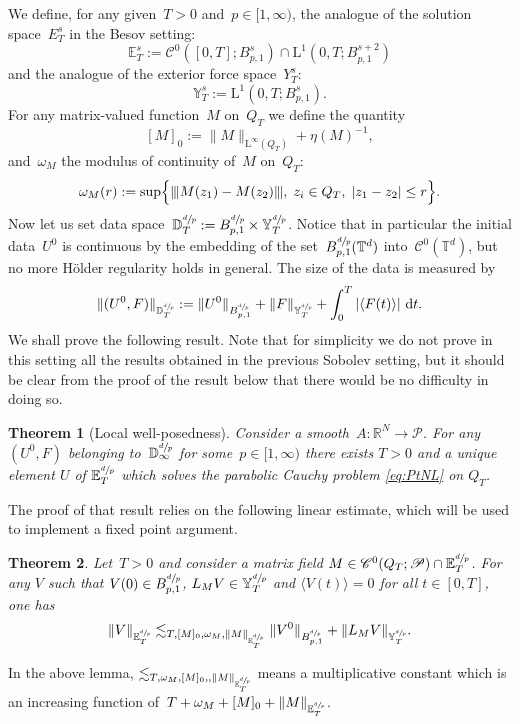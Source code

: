 \documentclass[JEP,XML,SOM,Unicode,published]{cedram}
\newtheorem{thm}{Theorem}
\theoremstyle{definition}
\newcommand\R{\mathbb{R}}
\newcommand\E{\mathbb{E}}
\newcommand\T{\mathbb{T}}
\newcommand\dd{\mathrm{d}}
\renewcommand\L{\mathrm{L}}
\newcommand{\vertiii}[1]{{\vert\kern-0.08em\vert\kern-0.08em\vert #1 \vert\kern-0.08em\vert\kern-0.08em\vert}}
\begin{document}
We define, for any given~$T>0$ and~$p \in [1,\infty)$, the analogue of the solution space~$E_T^s$ in the Besov setting:
\[
\E^s_T:= \mathcal C^0 ([0,T];B^s_{p,1}) \cap \L^1 (0,T;B^{s+2}_{p,1})
\]
and the analogue of the exterior force space~$Y_T^s$:
\[
{\mathbb Y}_T^{s}:= \L^1 (0,T;B^{s }_{p,1}).
\]
For any matrix-valued function~$M$ on~$Q_T$ we define the quantity
\begin{equation}\label{defnormalphabesov}
[M]_{0}:=\|M\|_{\L^\infty(Q_T)}+\eta(M)^{-1},\end{equation}
and~$ \omega_M $ the modulus of continuity of~$M$ on~$Q_T$:
\[
\omega_M(r):=\sup\Bigl\{ \vertiii {M(z_1)- M(z_2)}, \; z_i \in Q_T, \; |z_1-z_2| \leq r\Bigr\}.
\]
Now let us set data space~$
\mathbb D_T^{\sfrac dp}:=B^{\sfrac dp}_{p,1}\times{\mathbb Y}_T^{\sfrac dp} $. Notice that in particular the initial data~$U^0$ is continuous by the embedding of the set~$B^{\sfrac dp}_{p,1}(\T^d)$ into~$ \mathcal C^0(\T^d)$, but no more H\"older regularity holds in general. The size of the data is measured by
\[
\|(U^0,F)\|_{ \mathbb D_T^{\sfrac dp}}:= \|U^0\|_{B^{\sfrac dp}_{p,1}} + \|F\|_{{\mathbb Y}_T^{\sfrac dp} } + \int_0^T \left|\langle F(t)\rangle\right|\,\dd t.
\]
We shall prove the following result. Note that for simplicity we do not prove in this setting all the results obtained in the previous Sobolev setting, but it should be clear from the proof of the result below that there would be no difficulty in doing so.
\begin{thm}[Local well-posedness] \label{thm:exlocbesov}
Consider a smooth~$A:\R^N\to \mathscr{P}$. For any $(U^0,F)$ belonging to~$ \mathbb D_\infty^{\sfrac dp}$ for some~$p \in [1,\infty)$ there exists $T>0$ and a unique element $U$ of $\E^{\sfrac dp}_T$ which solves the parabolic Cauchy problem \eqref{eq:PtNL} on $Q_T$.
\end{thm}
The proof of that result relies on the following linear estimate, which will be used to implement a fixed point argument.
\begin{thm} \label{thm:PetrovskiiBesov}
Let~$T>0$ and consider a matrix field $M\in\mathscr{C}^{0}(Q_T;\mathscr{P})\cap \E^{\sfrac dp}_T$. For any $V$ such that $V(0)\in B^{\sfrac dp}_{p,1}$, $L_{M }V\in{\mathbb Y}_T^{\sfrac dp} $ and $\langle V(t)\rangle=0$ for all $t\in[0,T]$, one has
\begin{align}\label{thm2Hsestimate:bes}
\| V \|_{ \E^{\sfrac dp}_T} \lesssim_{T,[M]_{0},\omega_M,\|M\|_{ \E^{\sfrac dp}_T}} \|V^0\|_{B^{\sfrac dp}_{p,1}} + \|L_{M }V\|_{{\mathbb Y}_T^{\sfrac dp}}.
\end{align}
\end{thm}
In the above lemma, $ \lesssim_{T,\omega_M,[M]_0,,\|M\|_{ \E^{\sfrac dp}_T}} $ means a multiplicative constant which is an increasing function of~$T+\omega_M+[M]_0+\|M\|_{ \E^{\sfrac dp}_T}$.
\end{document}
